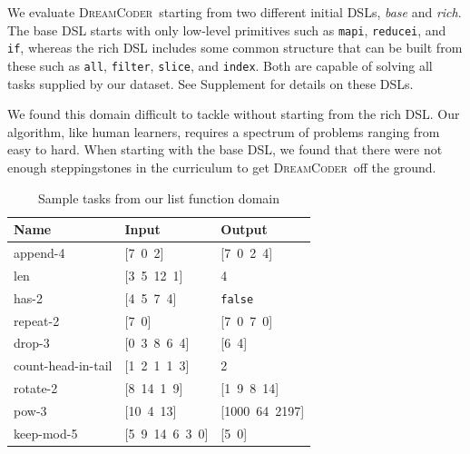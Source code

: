 \documentclass{article}
\newcommand{\system}{\textsc{DreamCoder}~}
\newcommand{\code}[1]{{\footnotesize\texttt{#1}}}
\begin{document}
We evaluate \system starting from two different initial DSLs, \emph{base} and
\emph{rich}. The base DSL starts with only
low-level primitives such as \code{mapi}, \code{reducei}, and
\code{if}, whereas the rich DSL includes some common structure that can be
built from these such as \code{all}, \code{filter}, \code{slice}, and
\code{index}.
Both are capable of solving all tasks supplied by our dataset.
See Supplement for details on these DSLs.

We found  this domain  difficult to tackle without starting from 
the rich DSL. Our
algorithm, like human learners, requires a spectrum of problems ranging from
easy to hard.
When starting with the base DSL,
we found that there were not enough steppingstones in the curriculum to
get \system off the ground.


\begin{table}
\centering
\begin{tabular}{lll}
  \toprule
  Name & Input & Output \\\midrule
  append-4 & [7\, 0\, 2] & [7\, 0\, 2\, 4] \\
  len & [3\, 5\, 12\, 1] & 4 \\
  has-2 & [4\, 5\, 7\, 4] & \code{false} \\
  repeat-2 & [7\, 0] & [7\, 0\, 7\, 0] \\
  drop-3 & [0\, 3\, 8\, 6\, 4] & [6\, 4] \\
  count-head-in-tail & [1\, 2\, 1\, 1\, 3] & 2 \\
  rotate-2 & [8\, 14\, 1\, 9] & [1\, 9\, 8\, 14] \\
  pow-3 & [10\, 4\, 13] & [1000\, 64\, 2197] \\
  keep-mod-5 & [5\, 9\, 14\, 6\, 3\, 0] & [5\, 0] \\
  \bottomrule
\end{tabular}
\caption{Sample tasks from our list function domain %
}
\label{listexamples}
\end{table}
\end{document}

